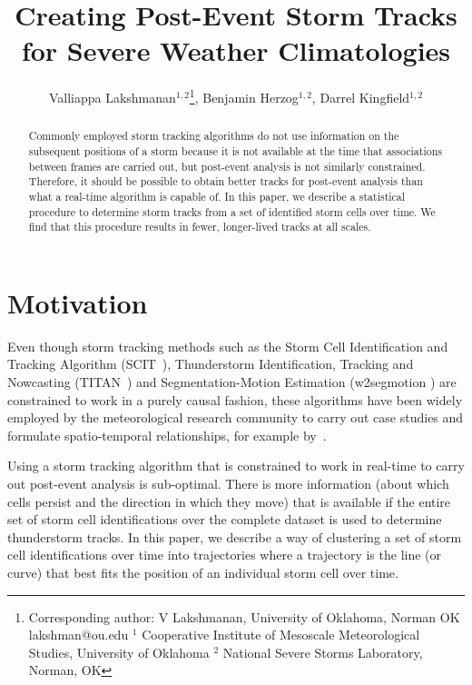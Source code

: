 \documentclass[11pt,twocolumn,twoside]{IEEEtran}
\begin{document}
\title{\vspace{0.2in}\sc Creating Post-Event Storm Tracks for Severe Weather Climatologies}
\author{Valliappa Lakshmanan$^{1,2}$\thanks{Corresponding author: V Lakshmanan, University of Oklahoma, Norman OK lakshman@ou.edu $^1$ Cooperative Institute of Mesoscale Meteorological Studies, University of Oklahoma $^2$ National Severe Storms Laboratory, Norman, OK}, Benjamin Herzog$^{1,2}$, Darrel Kingfield$^{1,2}$}

\maketitle
\thispagestyle{fancy}

\begin{abstract}
Commonly employed storm tracking algorithms do not use information on the
subsequent positions of a storm because it is not available at
the time that associations between frames are carried out,
but post-event analysis is
not similarly constrained. Therefore, it should be possible to
obtain better tracks for post-event analysis than what a real-time
algorithm is capable of. In this paper, we describe a statistical
procedure to determine storm tracks from a set of identified storm cells
over time. We find that this procedure results in fewer, longer-lived tracks
at all scales.
\end{abstract}

\section{Motivation}
Even though storm tracking methods such as the Storm Cell Identification
and Tracking Algorithm (SCIT~\cite{scit}), Thunderstorm Identification,
Tracking and Nowcasting (TITAN~\cite{titan}) and Segmentation-Motion
Estimation (w2segmotion \cite{atmosresearch,stormattr}) are constrained
to work in a purely causal fashion, these algorithms have been widely
employed by the meteorological research community to carry out case
studies and formulate spatio-temporal relationships, for example by~\cite{scituse1,scituse3,segmotionuse1,titanuse1}.

Using a storm tracking algorithm that is constrained to work in real-time
to carry out post-event analysis is sub-optimal. There is more information
(about which cells persist and the direction in which they move)
that is available if the entire set of storm
cell identifications over the complete dataset is used to determine
thunderstorm tracks. In this paper, we describe a way of clustering
a set of storm cell identifications over time into trajectories where
a trajectory is the line (or curve) that best fits the
position of an individual storm cell over time.
\end{document}
